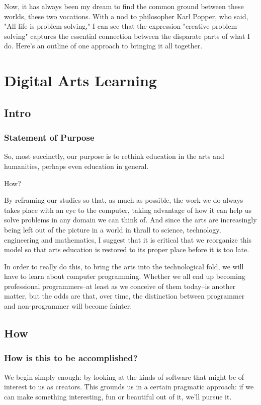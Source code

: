 \documentclass[11pt]{article}
\begin{document}
Now, it has always been my dream to find the common ground between
these worlds, these two vocations. With a nod to philosopher Karl
Popper, who said, "All life is problem-solving," I can see that
the expression "creative problem-solving" captures the essential
connection between the disparate parts of what I do. Here's an outline
of one approach to bringing it all together.
\section{Digital Arts Learning}
\label{sec:orgheadline10}
\subsection{Intro}
\label{sec:orgheadline3}
\subsubsection{Statement of Purpose}
\label{sec:orgheadline2}
So, most succinctly, our purpose is to rethink education in the arts
and humanities, perhaps even education in general.

How?

By reframing our studies so that, as much as possible, the work we do
always takes place with an eye to the computer, taking advantage of
how it can help us solve problems in any domain we can think of. And
since the arts are increasingly being left out of the picture in a
world in thrall to science, technology, engineering and mathematics,
I suggest that it is critical that we reorganize this model so that
arts education is restored to its proper place before it
is too late.

In order to really do this, to bring the arts into the technological
fold, we will have to learn about computer programming. Whether we all
end up becoming professional programmers--at least as we conceive of
them today--is another matter, but the odds are that, over time, the
distinction between programmer and non-programmer will become fainter.

\subsection{How}
\label{sec:orgheadline8}
\subsubsection{How is this to be accomplished?}
\label{sec:orgheadline4}
We begin simply enough: by looking at the kinds of software that might be of interest to us as creators. This grounds us in a certain pragmatic approach: if we can make something interesting, fun or beautiful out of it, we'll pursue it.
\end{document}
